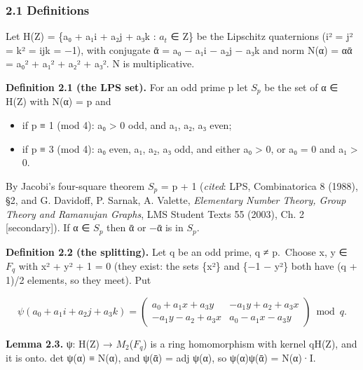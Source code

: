 \documentclass[
  10pt,
]{article}
\providecommand{\tightlist}{%
  \setlength{\itemsep}{0pt}\setlength{\parskip}{0pt}}
\begin{document}
\hypertarget{definitions}{%
\subsubsection{2.1 Definitions}\label{definitions}}

Let H(Z) = \{a₀ + a₁i + a₂j + a₃k : \(a_{t}\) ∈ Z\} be the Lipschitz
quaternions (i² = j² = k² = ijk = −1), with conjugate ᾱ = a₀ − a₁i − a₂j
− a₃k and norm N(α) = αᾱ = a₀² + a₁² + a₂² + a₃². N is multiplicative.

\textbf{Definition 2.1 (the LPS set).} For an odd prime p let \(S_{p}\)
be the set of α ∈ H(Z) with N(α) = p and

\begin{itemize}
\tightlist
\item
  if p ≡ 1 (mod 4): a₀ \textgreater{} 0 odd, and a₁, a₂, a₃ even;
\item
  if p ≡ 3 (mod 4): a₀ even, a₁, a₂, a₃ odd, and either a₀
  \textgreater{} 0, or a₀ = 0 and a₁ \textgreater{} 0.
\end{itemize}

By Jacobi's four-square theorem \textbar{}\(S_{p}\)\textbar{} = p + 1
(\emph{cited}: LPS, Combinatorica 8 (1988), §2, and G. Davidoff, P.
Sarnak, A. Valette, \emph{Elementary Number Theory, Group Theory and
Ramanujan Graphs}, LMS Student Texts 55 (2003), Ch. 2 {[}secondary{]}).
If α ∈ \(S_{p}\) then ᾱ or −ᾱ is in \(S_{p}\).

\textbf{Definition 2.2 (the splitting).} Let q be an odd prime, q ≠
p.~Choose x, y ∈ \(F_{q}\) with x² + y² + 1 = 0 (they exist: the sets
\{x²\} and \{−1 − y²\} both have (q + 1)/2 elements, so they meet). Put

\[\psi(a_0 + a_1 i + a_2 j + a_3 k) = \begin{pmatrix} a_0 + a_1 x + a_3 y & -a_1 y + a_2 + a_3 x \\ -a_1 y - a_2 + a_3 x & a_0 - a_1 x - a_3 y\end{pmatrix} \bmod q .\]

\textbf{Lemma 2.3.} ψ: H(Z) → \(M_{2}\)(\(F_{q}\)) is a ring
homomorphism with kernel qH(Z), and it is onto. det ψ(α) ≡ N(α), and
ψ(ᾱ) = adj ψ(α), so ψ(α)ψ(ᾱ) = N(α)·I.
\end{document}
